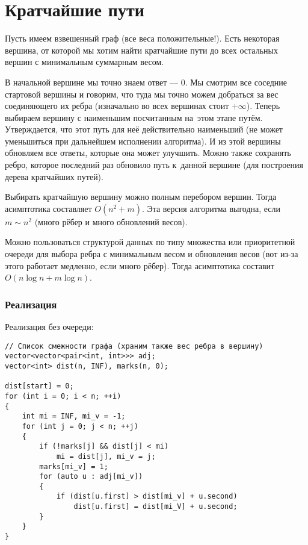 \section{Кратчайшие пути}

Пусть имеем взвешенный граф (все веса положительные!). Есть некоторая вершина, от которой мы хотим найти кратчайшие пути до всех остальных вершин с минимальным суммарным весом.

В начальной вершине мы точно знаем ответ --- $0$. Мы смотрим все соседние стартовой вершины и говорим, что туда мы точно можем добраться за вес соединяющего их ребра (изначально во всех вершинах стоит $+\infty$). Теперь выбираем вершину с наименьшим посчитанным на~этом этапе путём. Утверждается, что этот путь для неё действительно наименьший (не может уменьшиться при дальнейшем исполнении алгоритма). И из этой вершины обновляем все ответы, которые она может улучшить. Можно также сохранять ребро, которое последний раз обновило путь к~данной вершине (для построения дерева кратчайших путей).

Выбирать кратчайшую вершину можно полным перебором вершин. Тогда асимптотика составляет $O(n^2 + m)$. Эта версия алгоритма выгодна, если $m \sim n^2$ (много рёбер и много обновлений весов).

Можно пользоваться структурой данных по типу множества или приоритетной очереди для выбора ребра с минимальным весом и обновления весов (вот из-за этого работает медленно, если много рёбер). Тогда асимптотика составит $O(n\log n + m\log n)$.

\subsubsection{Реализация}

Реализация без очереди:

\begin{verbatim}
// Список смежности графа (храним также вес ребра в вершину)
vector<vector<pair<int, int>>> adj;
vector<int> dist(n, INF), marks(n, 0);

dist[start] = 0;
for (int i = 0; i < n; ++i)
{
    int mi = INF, mi_v = -1;
    for (int j = 0; j < n; ++j)
    {
        if (!marks[j] && dist[j] < mi)
            mi = dist[j], mi_v = j;
        marks[mi_v] = 1;
        for (auto u : adj[mi_v])
        {
            if (dist[u.first] > dist[mi_v] + u.second)
                dist[u.first] = dist[mi_V] + u.second;
        }
    }
}

\end{verbatim}

